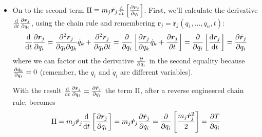 \documentclass[11pt, a4paper]{article}
\newcommand{\bdot}[1]{\dot{\bm{#1}}} %
\begin{document}
\begin{itemize}
	\item On to the second term $ \mathrm{II} \equiv m_{j} \bdot{r}_{j} \dv{}{t}\left[\pdv{\bm{r}_{j}}{q_{i}} \right] $. First, we'll calculate the derivative $ \dv{}{t} \pdv{\bm{r}_{j}}{q_{i}} $, using the chain rule and remembering $ \bm{r}_{j} = \bm{r}_{j}(q_{1}, \ldots, q_{n}, t) $:
	\begin{equation*}
		\dv{}{t} \pdv{\bm{r}_{j}}{q_{i}} = \pdv{\bm{r}_{j}}{q_{i}}{q_{k}} \dot{q}_{k} + \pdv{\bm{r}_{j}}{q_{i}}{t} = \pdv{}{q_{i}} \left[\pdv{\bm{r}_{j}}{q_{k}} \dot{q}_{k} + \pdv{\bm{r}_{j}}{t}\right] = \pdv{}{q_{i}}\left[\dv{\bm{r}_{j}}{t}\right] = \pdv{\bdot{r}_{j}}{q_{i}}
	\end{equation*}
	where we can factor out the derivative $ \pdv{}{q_{i}} $ in the second equality because $ \pdv{\dot{q}_{k}}{q_{i}} = 0$ (remember, the $ q_{i} $ and $ \dot{q}_{i} $ are different variables).
	
	With the result $ 	\dv{}{t} \pdv{\bm{r}_{j}}{q_{i}} = \pdv{\bdot{r}_{j}}{q_{i}} $ the term II, after a reverse engineered chain rule, becomes
	\begin{equation*}
		\mathrm{II} = m_{j} \bdot{r}_{j} \dv{}{t}\left[\pdv{\bm{r}_{j}}{q_{i}} \right]  = m_{j} \bdot{r}_{j} \pdv{\bdot{r}_{j}}{q_{i}} = \pdv{}{q_{i}} \left[\frac{m_{j} \bdot{r}_{j}^{2}}{2} \right] = \pdv{T}{q_{i}}
	\end{equation*}
	

\end{itemize}
\end{document}
